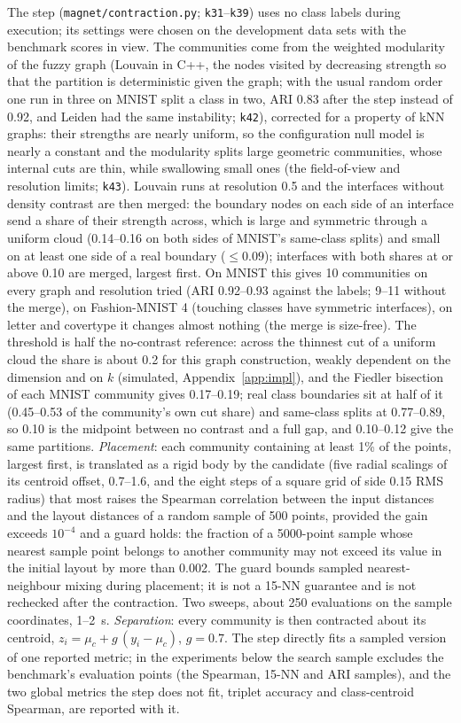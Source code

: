 \documentclass[11pt]{article}
\begin{document}
The step (\texttt{magnet/contraction.py}; \texttt{k31}--\texttt{k39}) uses no class labels during
execution; its settings were chosen on the development data sets with the benchmark scores in view. The
communities come from the weighted modularity of the fuzzy graph (Louvain in C++, the nodes visited by
decreasing strength so that the partition is deterministic given the graph; with the usual random order one run
in three on MNIST split a class in two, ARI 0.83 after the step instead of 0.92, and Leiden
\citep{traag2019leiden} had the same instability; \texttt{k42}), corrected for a property of kNN graphs: their
strengths are nearly uniform, so the configuration null model is nearly a constant and the modularity splits
large geometric communities, whose internal cuts are thin, while swallowing small ones (the field-of-view and
resolution limits; \texttt{k43}). Louvain runs at resolution 0.5 and the interfaces without density contrast are
then merged: the boundary nodes on each side of an interface send a share of their strength across, which is
large and symmetric through a uniform cloud (0.14--0.16 on both sides of MNIST's same-class splits) and small on
at least one side of a real boundary ($\le 0.09$); interfaces with both shares at or above 0.10 are merged, largest
first. On MNIST this gives 10 communities on every graph and resolution tried (ARI 0.92--0.93 against the labels;
9--11 without the merge), on Fashion-MNIST 4 (touching classes have symmetric interfaces), on letter and covertype
it changes almost nothing (the merge is size-free). The threshold is half the no-contrast reference: across the thinnest cut of a uniform cloud the share is
about 0.2 for this graph construction, weakly dependent on the dimension and on $k$ (simulated, Appendix~\ref{app:impl}),
and the Fiedler bisection of each MNIST community gives 0.17--0.19; real class boundaries sit at half of it
(0.45--0.53 of the community's own cut share) and same-class splits at 0.77--0.89, so 0.10 is the midpoint
between no contrast and a full gap, and 0.10--0.12 give the same partitions. \emph{Placement}:
each community containing at least 1\% of the points, largest first, is translated as a rigid body by the
candidate (five radial scalings of its centroid offset, 0.7--1.6, and the eight steps of a square grid of
side 0.15 RMS radius) that most raises the Spearman correlation between the input distances and the
layout distances of a random sample of 500 points, provided the gain exceeds $10^{-4}$ and a guard holds:
the fraction of a 5000-point sample whose nearest sample point belongs to another community may not
exceed its value in the initial layout by more than 0.002. The guard bounds sampled nearest-neighbour
mixing during placement; it is not a 15-NN guarantee and is not rechecked after the contraction. Two
sweeps, about 250 evaluations on the sample coordinates, 1--2~s. \emph{Separation}: every community is
then contracted about its centroid, $z_i = \mu_c + g\,(y_i - \mu_c)$, $g = 0.7$. The step directly fits
a sampled version of one reported metric; in the experiments below the search sample excludes the
benchmark's evaluation points (the Spearman, 15-NN and ARI samples), and the two global metrics the
step does not fit, triplet accuracy and class-centroid Spearman, are reported with it.
\end{document}
